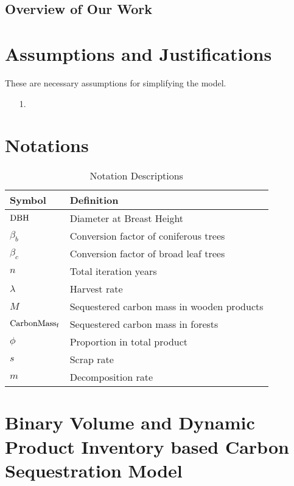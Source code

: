 \documentclass{mcmthesis}
\numberwithin{figure}{section}
\numberwithin{table}{section}
\numberwithin{equation}{section}
\begin{document}
\newpage
\subsection{Overview of Our Work}

\section{Assumptions and Justifications}
These are necessary assumptions for simplifying the model.
\begin{enumerate}
  \item [1.] 
\end{enumerate}


\section{Notations}

\renewcommand\arraystretch{1.5}

\begin{table}[htpb!]
  \centering
  \caption{Notation Descriptions}
  \begin{tabular}{m{2.5cm}<{\centering}|m{12.5cm}<{\centering}}
  \toprule[1.5pt]
  \textbf{Symbol} & \textbf{Definition} \\ \hline
  $ \rm{DBH} $ & Diameter at Breast Height \\
  $ \beta_b $ & Conversion factor of coniferous trees\\
  $\beta_c$ & Conversion factor of broad leaf trees\\
  $ n $ & Total iteration years\\
  $ \lambda $ & Harvest rate\\
  $ M $ & Sequestered carbon mass in wooden products \\
  $ \rm{CarbonMass_f} $ & Sequestered carbon mass in forests \\
  $ \phi $ & Proportion in total product\\
  $ s $ & Scrap rate\\
  $ m $ & Decomposition rate \\

  \bottomrule[1.5pt]
  \end{tabular}
\end{table}


\section{Binary Volume and Dynamic Product Inventory based Carbon Sequestration Model}
\end{document}
